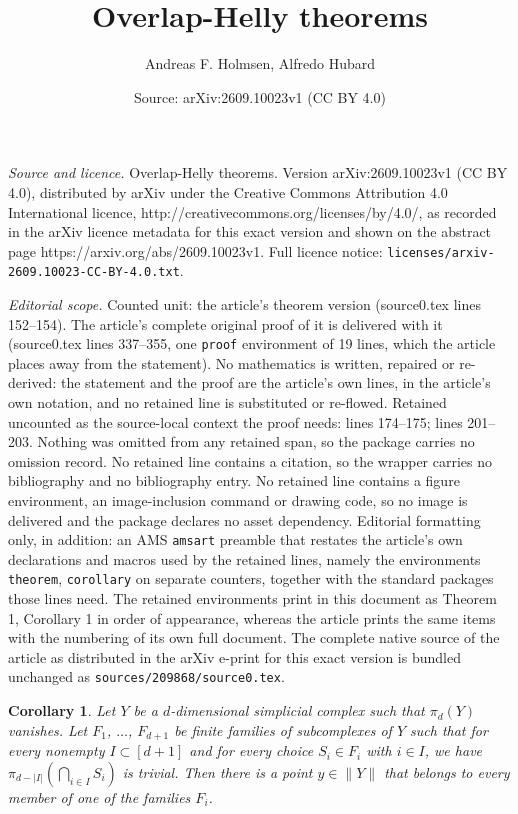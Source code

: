 \documentclass[10pt,a4paper]{amsart}
\title{Overlap-Helly theorems}
\author{Andreas F. Holmsen, Alfredo Hubard}
\date{Source: arXiv:2609.10023v1 (CC BY 4.0)}
\newtheorem{corollary}{Corollary}
\begin{document}
\maketitle

\noindent\emph{Source and licence.} Overlap-Helly theorems. Version arXiv:2609.10023v1 (CC BY 4.0), distributed by arXiv under the Creative Commons Attribution 4.0 International licence, http://creativecommons.org/licenses/by/4.0/, as recorded in the arXiv licence metadata for this exact version and shown on the abstract page https://arxiv.org/abs/2609.10023v1. Full licence notice: \texttt{licenses/arxiv-2609.10023-CC-BY-4.0.txt}.\par\smallskip

\noindent\textit{Editorial scope.} Counted unit: the article's theorem version (source0.tex lines 152--154). The article's complete original proof of it is delivered with it (source0.tex lines 337--355, one \texttt{proof} environment of 19 lines, which the article places away from the statement). No mathematics is written, repaired or re-derived: the statement and the proof are the article's own lines, in the article's own notation, and no retained line is substituted or re-flowed.  Retained uncounted as the source-local context the proof needs: lines 174--175; lines 201--203.  Nothing was omitted from any retained span, so the package carries no omission record.  No retained line contains a citation, so the wrapper carries no bibliography and no bibliography entry.  No retained line contains a figure environment, an image-inclusion command or drawing code, so no image is delivered and the package declares no asset dependency.  Editorial formatting only, in addition: an AMS \texttt{amsart} preamble that restates the article's own declarations and macros used by the retained lines, namely the environments \texttt{theorem}, \texttt{corollary} on separate counters, together with the standard packages those lines need.  The retained environments print in this document as Theorem 1, Corollary 1 in order of appearance, whereas the article prints the same items with the numbering of its own full document.  The complete native source of the article as distributed in the arXiv e-print for this exact version is bundled unchanged as \texttt{sources/209868/source0.tex}.
\begin{corollary}\label{cor:good covers}
Let $Y$ be a $d$-dimensional simplicial complex such that $\pi_d(Y)$ vanishes. Let $F_1$, $\dots$, $F_{d+1}$ be finite families of subcomplexes of $Y$ such that for every nonempty $I\subset [d+1]$ and for every choice $S_i\in F_i$ with $i\in I$, we have $\pi_{d-|I|}(\bigcap_{i\in I}S_i)$ is trivial. Then there is a point $y\in \|Y\|$ that belongs to every member of one of the families $F_i$.  \end{corollary}
\end{document}
